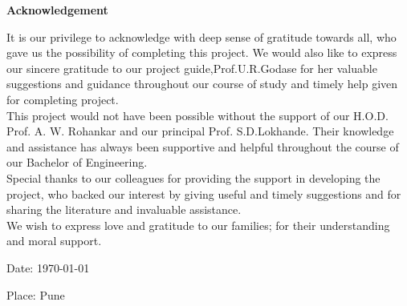 \begin{center}
{\LARGE \bf Acknowledgement}
\end{center}
\vspace{5mm}

\justifying
\hspace{1cm}
	It is our privilege to acknowledge with deep sense of gratitude towards all, who gave us the possibility of completing this project. We would also like to express our sincere gratitude to our project guide,Prof.U.R.Godase for her valuable suggestions and guidance throughout our course of study and timely help given for completing project.\\
\hspace*{1cm}This project would not have been possible without the support of our H.O.D. Prof. A. W. Rohankar and our principal Prof. S.D.Lokhande. Their knowledge and assistance has always been supportive and helpful throughout the course of our Bachelor of Engineering.\\
\hspace*{1cm}Special thanks to our colleagues for providing the support in developing the project, who backed our interest by giving useful and timely suggestions and for sharing the literature and invaluable assistance.\\
\hspace*{1cm}We wish to express love and gratitude to our families; for their understanding and moral support.\\

\vspace{5mm}
\begin{flushright}

Date: \ddmmyyyydate \today
\end{flushright}
\begin{flushright}       
Place:\hspace*{1cm} Pune \\
\end{flushright}
